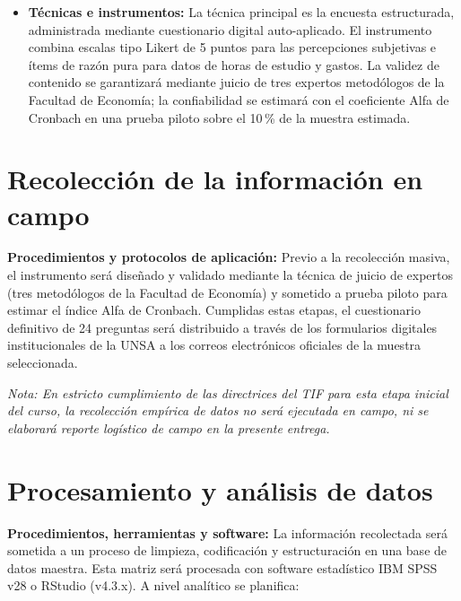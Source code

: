 \documentclass[11pt, a4paper]{article}
\begin{document}
\begin{itemize}
    \item \textbf{Técnicas e instrumentos:} La técnica principal es la encuesta estructurada, administrada mediante cuestionario digital auto-aplicado. El instrumento combina escalas tipo Likert de 5 puntos para las percepciones subjetivas e ítems de razón pura para datos de horas de estudio y gastos. La validez de contenido se garantizará mediante juicio de tres expertos metodólogos de la Facultad de Economía; la confiabilidad se estimará con el coeficiente Alfa de Cronbach en una prueba piloto sobre el 10\,\% de la muestra estimada.
\end{itemize}

\section{Recolección de la información en campo}

\textbf{Procedimientos y protocolos de aplicación:} Previo a la recolección masiva, el instrumento será diseñado y validado mediante la técnica de juicio de expertos (tres metodólogos de la Facultad de Economía) y sometido a prueba piloto para estimar el índice Alfa de Cronbach. Cumplidas estas etapas, el cuestionario definitivo de 24 preguntas será distribuido a través de los formularios digitales institucionales de la UNSA a los correos electrónicos oficiales de la muestra seleccionada.

\textit{Nota: En estricto cumplimiento de las directrices del TIF para esta etapa inicial del curso, la recolección empírica de datos no será ejecutada en campo, ni se elaborará reporte logístico de campo en la presente entrega.}

\section{Procesamiento y análisis de datos}

\textbf{Procedimientos, herramientas y software:} La información recolectada será sometida a un proceso de limpieza, codificación y estructuración en una base de datos maestra. Esta matriz será procesada con software estadístico IBM SPSS v28 o RStudio (v4.3.x). A nivel analítico se planifica:
\end{document}

